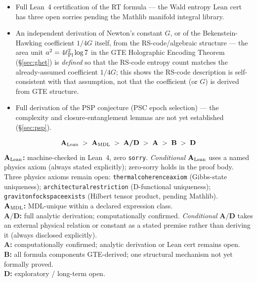 \documentclass[11pt]{article}
\theoremstyle{remark}
\newcommand{\lean}[1]{%
  \penalty-100
  \begingroup\def\_{\textunderscore\allowbreak}\texttt{#1}\endgroup}
\newcommand{\lPl}{\ell_{\rm Pl}}
\newcommand{\CatA}{\textbf{A}}
\newcommand{\CatAL}{\ensuremath{\textbf{A}_{\rm Lean}}}
\newcommand{\CatAMDL}{\ensuremath{\textbf{A}_{\rm MDL}}}
\newcommand{\CatAD}{\textbf{A/D}}
\newcommand{\CatB}{\textbf{B}}
\newcommand{\CatD}{\textbf{D}}
\begin{document}
\begin{tcolorbox}[colback=orange!6,colframe=orange!70!black,
  title={\textbf{What this paper claims and does not claim}},
  fonttitle=\bfseries,left=6pt,right=6pt,top=5pt,bottom=5pt]
\begin{itemize}[noitemsep,topsep=2pt]
        blocked on a Mathlib geometry library (\S\ref{sec:cmb}).
  \item Full Lean~4 certification of the RT formula --- the Wald entropy Lean cert
        has three open sorries pending the Mathlib manifold integral library.
  \item An independent derivation of Newton's constant $G$, or of the
        Bekenstein-Hawking coefficient $1/4G$ itself, from the RS-code/algebraic
        structure --- the area unit $a^2=4\lPl^2\log 7$ in the GTE Holographic
        Encoding Theorem (\S\ref{sec:ghet}) is \emph{defined} so that the RS-code
        entropy count matches the already-assumed coefficient $1/4G$; this shows the
        RS-code description is self-consistent with that assumption, not that the
        coefficient (or $G$) is derived from GTE structure.
  \item Full derivation of the PSP conjecture (PSC epoch selection) ---
        the complexity and closure-entanglement lemmas are not yet established
        (\S\ref{sec:psp}).
\end{itemize}
\end{tcolorbox}

\begin{tcolorbox}[colback=gray!4,colframe=gray!50!black,
  title={\textbf{Claim-strength taxonomy}},
  fonttitle=\bfseries,left=6pt,right=6pt,top=5pt,bottom=5pt]
\small
\[
\CatAL \;>\; \CatAMDL \;>\; \CatAD \;>\; \CatA \;>\; \CatB \;>\; \CatD
\]
\textbf{$\CatAL$:} machine-checked in Lean~4, zero \texttt{sorry}.
  \emph{Conditional} $\CatAL$ uses a named physics axiom (always stated explicitly);
  zero-sorry holds in the proof body.
  Three physics axioms remain open: \lean{thermal\_coherence\_axiom}
  (Gibbs-state uniqueness); \lean{architectural\_restriction}
  (D-functional uniqueness); \lean{graviton\_fock\_space\_exists}
  (Hilbert tensor product, pending Mathlib).\\
\textbf{$\CatAMDL$:} MDL-unique within a declared expression class.\\
\textbf{$\CatAD$:} full analytic derivation; computationally confirmed.
  \emph{Conditional} $\CatAD$ takes an external physical relation or constant as a
  stated premise rather than deriving it (always disclosed explicitly).\\
\textbf{$\CatA$:} computationally confirmed; analytic derivation or Lean cert remains open.\\
\textbf{$\CatB$:} all formula components GTE-derived; one structural mechanism not yet formally proved.\\
\textbf{$\CatD$:} exploratory / long-term open.
\end{tcolorbox}
\end{document}

